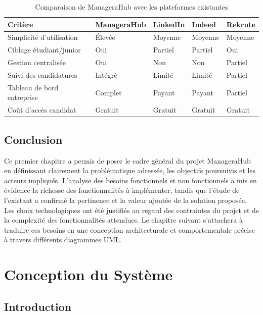 \documentclass[12pt,a4paper]{report}
\begin{document}
\begin{table}[H]
\centering
\caption{Comparaison de ManageraHub avec les plateformes existantes}
\begin{tabularx}{\textwidth}{lXXXX}
\toprule
\textbf{Critère} & \textbf{ManageraHub} & \textbf{LinkedIn} & \textbf{Indeed} & \textbf{Rekrute} \\
\midrule
Simplicité d'utilisation & Élevée & Moyenne & Moyenne & Moyenne \\
Ciblage étudiant/junior & Oui & Partiel & Partiel & Oui \\
Gestion centralisée & Oui & Non & Non & Partiel \\
Suivi des candidatures & Intégré & Limité & Limité & Partiel \\
Tableau de bord entreprise & Complet & Payant & Payant & Partiel \\
Coût d'accès candidat & Gratuit & Gratuit & Gratuit & Gratuit \\
\bottomrule
\end{tabularx}
\end{table}

\section*{Conclusion}

Ce premier chapitre a permis de poser le cadre général du projet ManageraHub en définissant clairement la problématique adressée, les objectifs poursuivis et les acteurs impliqués. L'analyse des besoins fonctionnels et non fonctionnels a mis en évidence la richesse des fonctionnalités à implémenter, tandis que l'étude de l'existant a confirmé la pertinence et la valeur ajoutée de la solution proposée. Les choix technologiques ont été justifiés au regard des contraintes du projet et de la complexité des fonctionnalités attendues. Le chapitre suivant s'attachera à traduire ces besoins en une conception architecturale et comportementale précise à travers différents diagrammes UML.

\chapter{Conception du Système}

\section*{Introduction}
\end{document}
